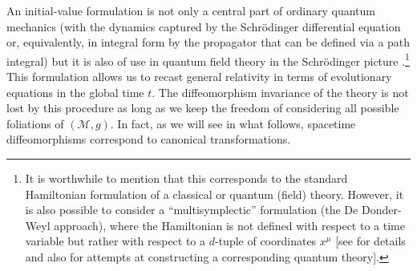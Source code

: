 \documentclass[12pt]{iopart}
\begin{document}
An initial-value formulation is not only a central part of ordinary quantum mechanics (with the dynamics captured by the Schr\"{o}dinger differential equation or, equivalently, in integral form by the propagator that can be defined via a path integral) but it is also of use in quantum field theory in the Schr\"{o}dinger picture \citep{Jackiw:1995be}.\footnote{It is worthwhile to mention that this corresponds to the standard Hamiltonian formulation of a classical or quantum (field) theory. However, it is also possible to consider a ``multisymplectic'' formulation (the De Donder-Weyl approach), where the Hamiltonian is not defined with respect to a time variable but rather with respect to a $d$-tuple of coordinates $x^{\mu}$ [see \cite{DW1,DW2,DW3,DW4} for details and also \cite{DW5,DW6} for attempts at constructing a corresponding quantum theory].} This formulation allows us to recast general relativity in terms of evolutionary equations in the global time $t$. The diffeomorphism invariance of the theory is not lost by this procedure as long as we keep the freedom of considering all possible foliations of $(\mathcal{M},g)$. In fact, as we will see in what follows, spacetime diffeomorphisms correspond to canonical transformations.
\end{document}
